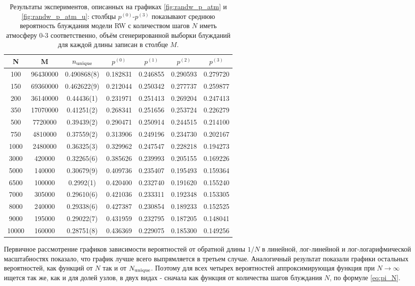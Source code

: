 \begin{table}[h] 
\centering
\begin{tabular}{|c|c|c|c|c|c|c|}
\hline
N & M & $ n_{\textup{unique}} $ & $p^{(0)}$ & $p^{(1)}$ & $p^{(2)}$ & $p^{(3)}$ \\ \hline
100 & 96430000 & 0.490868(8) & 0.182831 & 0.246855 & 0.290593 & 0.279720 \\ \hline
150 & 69360000 & 0.462622(9) & 0.212044 & 0.250342 &0.277737 &0.259877 \\ \hline
200 & 36140000 & 0.44436(1) & 0.231971 & 0.251413 & 0.269204 & 0.247413 \\ \hline
350 & 17070000 & 0.41251(2) & 0.268341 & 0.251656 &0.253724 & 0.226279 \\ \hline
500 & 7720000 & 0.39439(2) & 0.290471 & 0.250914 & 0.244515 & 0.214100 \\ \hline
750 & 4810000 & 0.37559(2) & 0.313906 & 0.249196 & 0.234730 & 0.202167 \\ \hline 
1000 & 2480000 & 0.36325(3) & 0.329962 & 0.247547 & 0.228218 & 0.194273 \\ \hline
3000 & 420000 & 0.32265(6) & 0.385626 & 0.239993& 0.205155 & 0.169226 \\ \hline
5000 & 140000 & 0.30679(9) & 0.409736 & 0.235407 & 0.195493 & 0.159364  \\ \hline
6500 & 100000 & 0.2992(1) & 0.420400 & 0.232740 & 0.191620 & 0.155240 \\ \hline
7000 & 305000 & 0.29610(6) & 0.421036 & 0.233311 & 0.192348 & 0.153305  \\ \hline
8000 & 240000 & 0.29338(6) & 0.427387 & 0.230854 & 0.189233 & 0.152525 \\ \hline
9000 & 195000 & 0.29022(7) & 0.431959 & 0.232795 & 0.187205 & 0.148041 \\ \hline
10000 & 160000 & 0.28751(8) & 0.436369 & 0.229075 & 0.185300 & 0.149256 \\ \hline
\end{tabular}
\caption{Результаты экспериментов, описанных на графиках \ref{fig:randw_p_atm} и \ref{fig:randw_p_atm_u}: столбцы $p^{(0)}$-$p^{(3)}$ показывают среднюю вероятность блуждания модели RW с количеством шагов $N$ иметь атмосферу 0-3 соответственно, объём сгенерированной выборки блужданий для каждой длины записан в столбце $M$.}
\label{tab:randw_p_atm}
\end{table}

Первичное рассмотрение графиков зависимости вероятностей от обратной длины $1/N$ в линейной, лог-линейной и лог-логарифмической масштабностях показало, что график лучше всего выпрямляется в третьем случае. 
Аналогичный результат показали графики остальных вероятностей, как функций от $N$ так и от $N_{\textup{unique}}$.
Поэтому для всех четырех вероятностей аппроксимирующая функция при $N \to \infty$ ищется так же, как и для долей узлов, в двух видах - сначала как функция от количества шагов блуждания $N$, по формуле \eqref{eq:pi_N}.

